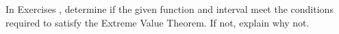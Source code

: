 {\noindent In Exercises}
{, determine if the given function and interval meet the conditions required to satisfy the Extreme Value Theorem.  If not, explain why not.}
